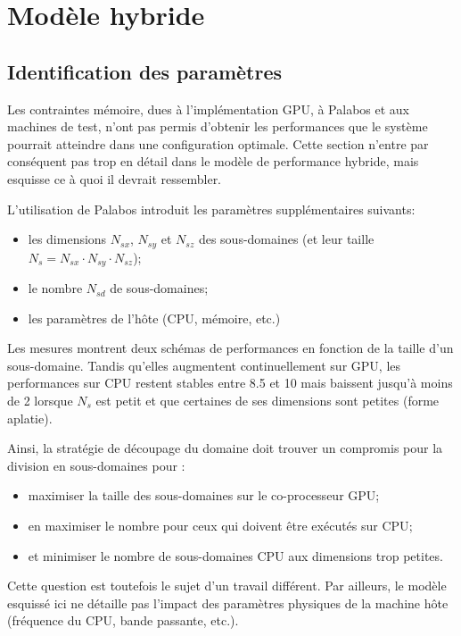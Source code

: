 \section{Modèle hybride}
\subsection{Identification des paramètres}
Les contraintes mémoire, dues à l'implémentation \acs{GPU}, à Palabos et aux machines de test, n'ont pas permis d'obtenir les performances que le système pourrait atteindre dans une configuration optimale. Cette section n'entre par conséquent pas trop en détail dans le modèle de performance hybride, mais esquisse ce à quoi il devrait ressembler. 

L'utilisation de Palabos introduit les paramètres supplémentaires suivants:
\begin{itemize}
\item les dimensions $N_{sx}$, $N_{sy}$ et $N_{sz}$ des sous-domaines (et leur taille $N_{s} = N_{sx}\cdot N_{sy}\cdot N_{sz}$);
\item le nombre $N_{sd}$ de sous-domaines;
\item les paramètres de l'hôte (\acs{CPU}, mémoire, etc.)
\end{itemize}

Les mesures montrent  deux schémas de performances en fonction de la taille d'un sous-domaine. Tandis qu’elles augmentent continuellement sur \acs{GPU}, les performances sur \acs{CPU} restent stables entre 8.5 et 10  mais baissent jusqu'à moins de 2  lorsque $N_{s}$ est petit et que certaines de ses dimensions sont petites (forme aplatie).

Ainsi,  la stratégie de découpage du domaine doit trouver un compromis pour la division en sous-domaines pour :
\begin{itemize}
\item maximiser la taille des sous-domaines sur le co-processeur \acs{GPU};
\item en maximiser le nombre pour ceux qui doivent être exécutés sur \acs{CPU};
\item et minimiser le nombre de sous-domaines \acs{CPU} aux dimensions trop petites.
\end{itemize}

\noindent Cette question est toutefois le sujet d'un travail différent. Par ailleurs, le modèle esquissé ici ne détaille pas l'impact des paramètres physiques de la machine hôte (fréquence du \acs{CPU}, bande passante, etc.).

